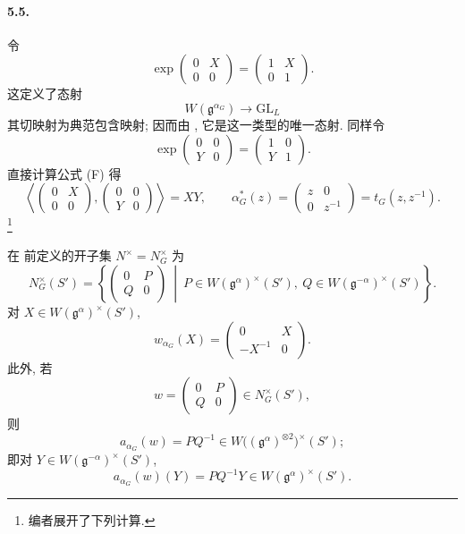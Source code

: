 \paragraph{\textbf{5.5.}}
令
\[
 \exp\begin{pmatrix}0&X\\0&0\end{pmatrix}
   =\begin{pmatrix}1&X\\0&1\end{pmatrix}.
\]
这定义了态射
\[
 W(\mathfrak g^{\alpha_G})\longrightarrow\mathrm{GL}_L
\]
其切映射为典范包含映射; 因而由 , 它是这一类型的唯一态射. 同样令
\[
 \exp\begin{pmatrix}0&0\\Y&0\end{pmatrix}
   =\begin{pmatrix}1&0\\Y&1\end{pmatrix}.
\]
直接计算公式 \textup{(F)} 得
\[
 \left\langle
 \begin{pmatrix}0&X\\0&0\end{pmatrix},
 \begin{pmatrix}0&0\\Y&0\end{pmatrix}
 \right\rangle
 =XY,
 \qquad
 \alpha_G^\ast(z)
 =\begin{pmatrix}z&0\\0&z^{-1}\end{pmatrix}
 =t_G(z,z^{-1}).
\]
\footnote{编者展开了下列计算.}

在  前定义的开子集 \(N^\times=N_G^\times\) 为
\[
 N_G^\times(S')
 =
 \left\{
 \begin{pmatrix}0&P\\Q&0\end{pmatrix}
 \ \middle|\
 P\in W(\mathfrak g^\alpha)^\times(S'),\
 Q\in W(\mathfrak g^{-\alpha})^\times(S')
 \right\}.
\]
对 \(X\in W(\mathfrak g^\alpha)^\times(S')\),
\[
 w_{\alpha_G}(X)
 =\begin{pmatrix}0&X\\-X^{-1}&0\end{pmatrix}.
\]
此外, 若
\[
 w=\begin{pmatrix}0&P\\Q&0\end{pmatrix}\in N_G^\times(S'),
\]
则
\[
 a_{\alpha_G}(w)=PQ^{-1}
   \in W\bigl((\mathfrak g^\alpha)^{\otimes2}\bigr)^\times(S');
\]
即对 \(Y\in W(\mathfrak g^{-\alpha})^\times(S')\),
\[
 a_{\alpha_G}(w)(Y)=PQ^{-1}Y
   \in W(\mathfrak g^\alpha)^\times(S').
\]

